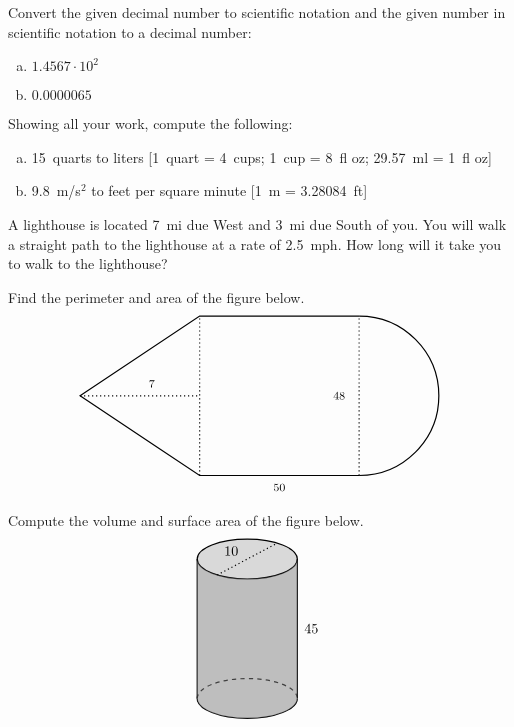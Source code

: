 \documentclass[12pt,letterpaper]{exam}
\begin{document}
\begin{questions}
\newpage
\question[5] Convert the given decimal number to scientific notation and the given number in scientific notation to a decimal number:
	\begin{enumerate}[(a)]
	\item $1.4567 \cdot 10^2$
	\item $0.0000065$
	\end{enumerate}



\newpage
\question[5] Showing all your work, compute the following:
	\begin{enumerate}[(a)]
	\item 15~quarts to liters [1~quart = 4~cups; 1~cup = 8~fl oz; 29.57~ml = 1~fl oz]
	\item 9.8~m/s$^2$ to feet per square minute [1~m = 3.28084~ft]
	\end{enumerate}



\newpage
\question[5] A lighthouse is located 7~mi due West and 3~mi due South of you. You will walk a straight path to the lighthouse at a rate of 2.5~mph. How long will it take you to walk to the lighthouse? 



\newpage
\question[5] Find the perimeter and area of the figure below. 
	\[
	\begin{tikzpicture}
	\draw[line width=0.03cm] (4,-2) -- (0,-2) -- (-3,0) -- (0,2) -- (4,2);
	\draw[line width=0.03cm] (4,-2) arc(-90:90:2);
	
	\draw[line width=0.03cm,dotted] (-3,0) -- (0,0);
	\draw[line width=0.03cm,dotted] (0,-2) -- (0,2);
	\draw[line width=0.03cm,dotted] (4,-2) -- (4,2);
	
	\node at (-1.2,0.3) {\footnotesize 7};
	\node at (2,-2.3) {\footnotesize 50};
	\node at (3.5,0) {\footnotesize 48};
	\end{tikzpicture}
	\]   



\newpage
\question[5] Compute the volume and surface area of the figure below. 
	\[
	\begin{tikzpicture}
	\draw[line width= 0.03cm,fill=gray!30] (0,3.5) ellipse (1.25 and 0.5);	%
	\draw[line width= 0.03cm] (-1.25,3.5) -- (-1.25,0); %
	\draw[line width= 0.03cm] (1.25,0) -- (1.25,3.5);  %
	\draw[line width= 0.03cm] (-1.25,0) arc (180:360:1.25 and 0.5); %
	\draw[line width= 0.03cm, dashed] (-1.25,0) arc (180:360:1.25 and -0.5); %
	\fill[gray,opacity=0.5] (-1.25,3.5) -- (-1.25,0) arc (180:360:1.25 and 0.5) -- (1.25,3.5) arc (0:180:1.25 and -0.5); %
	
	\draw[line width= 0.03cm,dotted] (-0.75,3.1) -- (0.75,3.9); %
	
	\node at (-0.4,3.7) {10};
	\node at (1.6,1.75) {45};
	\end{tikzpicture}
	\]


\end{questions}
\end{document}
